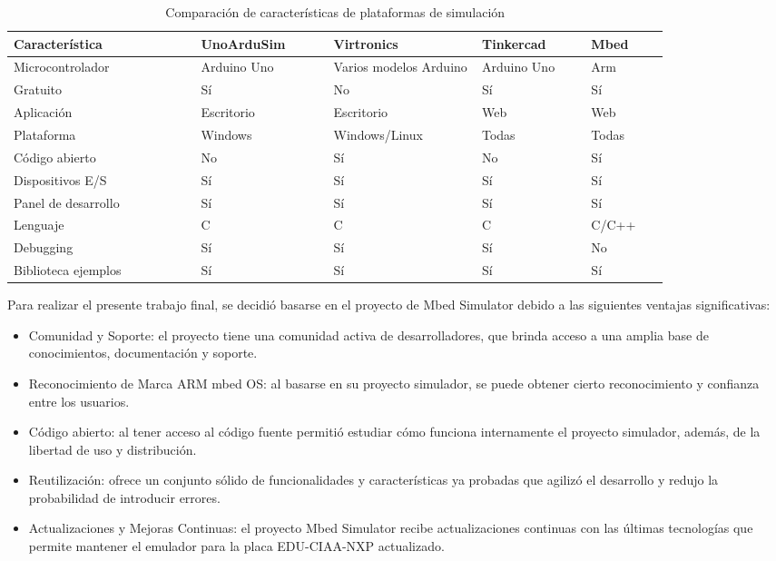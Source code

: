 \begin{table}[h]
\centering
\caption[Comparación de características de plataformas de simulación]{Comparación de características de plataformas de simulación}
\begin{tabular}{p{0.24\linewidth} p{0.17\linewidth}  p{0.19\linewidth}  p{0.14\linewidth}  p{0.10\linewidth}}
\toprule
\textbf{Característica} 
& \textbf{UnoArduSim}
& \textbf{Virtronics}
& \textbf{Tinkercad}
& \textbf{Mbed}
\\
\midrule
Microcontrolador & Arduino Uno & Varios modelos Arduino & Arduino Uno & Arm\\
Gratuito &    Sí & No & Sí & Sí\\
Aplicación & Escritorio & Escritorio & Web & Web\\
Plataforma & Windows & Windows/Linux & Todas & Todas\\
Código abierto & No & Sí & No & Sí\\
Dispositivos E/S & Sí & Sí & Sí & Sí  \\
Panel de desarrollo & Sí & Sí & Sí & Sí \\
Lenguaje & C & C & C & C/C++\\
Debugging & Sí & Sí & Sí & No\\
Biblioteca ejemplos & Sí & Sí & Sí & Sí\\
\bottomrule
\hline
\end{tabular}
\label{tab:simuladores}
\end{table}


Para realizar el presente trabajo final, se decidió basarse en el proyecto de Mbed Simulator debido a las siguientes ventajas significativas:

\begin{itemize}
	\item Comunidad y Soporte: el proyecto tiene una comunidad activa de desarrolladores, que brinda acceso a una amplia base de conocimientos, documentación y soporte. 
	\item Reconocimiento de Marca ARM mbed OS: al basarse en su proyecto simulador, se puede obtener cierto reconocimiento y confianza entre los usuarios.
	\item Código abierto: al tener acceso al código fuente permitió estudiar cómo funciona internamente el proyecto simulador, además, de la libertad de uso y distribución.
	\item Reutilización: ofrece un conjunto sólido de funcionalidades y características ya probadas que agilizó el desarrollo y redujo la probabilidad de introducir errores.
	\item Actualizaciones y Mejoras Continuas: el proyecto Mbed Simulator recibe actualizaciones continuas con las últimas tecnologías que permite mantener el emulador para la placa EDU-CIAA-NXP actualizado.
	
\end{itemize}



